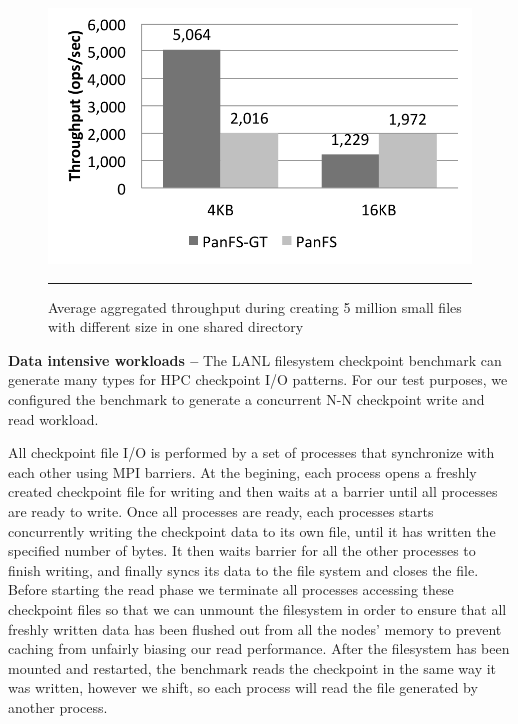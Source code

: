 \begin{figure}[t]  %
\centerline{\includegraphics[scale=0.7]{./figs/small_file_creates}}
\vspace{10pt}
\caption{\footnotesize
\textsf{Average aggregated throughput during creating 5 million small files
with different size in one shared directory}
}
\hrule
\label{graph:smallfiles}
\end{figure}       %



\textbf{Data intensive workloads -- }
The LANL filesystem checkpoint benchmark can
generate many types for HPC checkpoint I/O patterns.
For our test purposes, we configured the benchmark to generate
a concurrent N-N checkpoint write and read workload.

All checkpoint file I/O is performed by a set of processes
that synchronize with each other using MPI barriers.
At the begining, each process opens a freshly created checkpoint file
for writing and then waits at a barrier until all processes are ready to write.
Once all processes are ready, each processes starts
concurrently writing the checkpoint data to its own file,
until it has written the specified number of bytes.
It then waits barrier for all the other processes to finish writing,
and finally syncs its data to the file system and closes the file.
Before starting the read phase we terminate all processes
accessing these checkpoint files so that
we can unmount the filesystem in order to ensure that
all freshly written data has been flushed out from all the nodes' memory
to prevent caching from unfairly biasing our read performance.
After the filesystem has been mounted and restarted,
the benchmark reads the checkpoint in the same way it was written,
however we shift, so each process will read
the file generated by another process.

